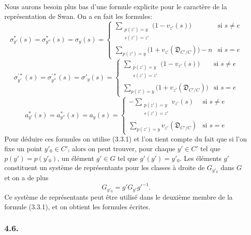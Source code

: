 \documentclass[11pt]{article}
\begin{document}
Nous
aurons besoin plus bas d'une formule explicite pour le caractère de la représentation de Swan. On a en fait les formules:
\[
\sigma^{*}_{y'}(s)=\sigma^{*}_{y''}(s)=\sigma_y(s)=
\begin{cases}
\displaystyle\sum_{\substack{p(z')=y\\s(z')=z'}}\bigl(1-v_{z'}(s)\bigr)& \text{si } s\ne e\\[0.8em]
\displaystyle\sum_{p(z')=y}\bigl(1+v_{z'}(\mathfrak D_{C'/C})\bigr)-n& \text{si } s=e
\end{cases}
\tag{4.5.1}
\]
\[
\sigma^{\prime*}_{y'}(s)=\sigma^{\prime*}_{y''}(s)=\sigma'_y(s)=
\begin{cases}
\displaystyle\sum_{\substack{p(z')=y\\s(z')=z'}}\bigl(1-v_{z'}(s)\bigr)& \text{si } s\ne e\\[0.8em]
\displaystyle\sum_{p(z')=y}\bigl(1+v_{z'}(\mathfrak D_{C'/C})\bigr)& \text{si } s=e
\end{cases}
\tag{4.5.2}
\]
\[
a^{*}_{y'}(s)=a^{*}_{y''}(s)=a_y(s)=
\begin{cases}
\displaystyle-\sum_{\substack{p(z')=y\\s(z')=z'}}v_{z'}(s)& \text{si } s\ne e\\[0.8em]
\displaystyle\sum_{p(z')=y}v_{z'}(\mathfrak D_{C'/C})& \text{si } s=e
\end{cases}
\tag{4.5.3}
\]
Pour déduire ces formules on utilise (3.3.1) et l'on tient compte du fait que si l'on fixe un point $y'_0\in C'$, alors on peut trouver, pour chaque $y'\in C'$ tel que $p(y')=p(y'_0)$, un élément $g'\in G$ tel que $g'(y')=y'_0$. Les éléments $g'$ constituent un système de représentants pour les classes à droite de $G_{y'_0}$ dans $G$ et on a de plus
\[
G_{y'_0}=g'G_{y'}g'^{-1}.
\]
Ce système de représentants peut être utilisé dans le deuxième membre de la formule (3.3.1), et on obtient les formules écrites.

\subsubsection*{4.6.}
\end{document}
